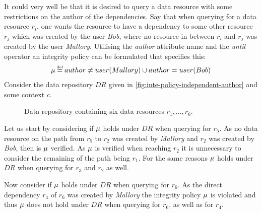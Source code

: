 \begin{example}
It could very well be that it is desired to query a data resource with some restrictions on the author of the dependencies. Say that when querying for a data resource $r_i$, one wants the resource to have a dependency to some other resource $r_j$ which was created by the user \emph{Bob}, where no resource in between $r_i$ and $r_j$ was created by the user \emph{Mallory}. Utilising the \emph{author} attribute name and the \emph{until} operator an integrity policy can be formulated that specifies this:
\begin{align*}
    \inte \eqdef author \neq user(Mallory) \U author = user(Bob)
\end{align*}
Consider the data repository $DR$ given in \autoref{fig:inte-policy-independent-author} and some context $c$.
\begin{figure}[!ht]
    \begin{center}
        
        \caption{Data repository containing six data resources $r_1, \ldots, r_6$.}
        \label{fig:inte-policy-independent-author}
    \end{center}
\end{figure}
Let us start by considering if $\mu$ holds under $DR$ when querying for $r_5$. As no data resource on the path from $r_5$ to $r_2$ was created by \emph{Mallory} and $r_2$ was created by \emph{Bob}, then is $\mu$ verified. As $\mu$ is verified when reaching $r_2$ it is unnecessary to consider the remaining of the path being $r_1$. For the same reasons $\mu$ holds under $DR$ when querying for $r_3$ and $r_2$ as well.

Now consider if $\mu$ holds under $DR$ when querying for $r_6$. As the direct dependency $r_4$ of $r_6$ was created by \emph{Mallory} the integrity policy $\mu$ is violated and thus $\mu$ does not hold under $DR$ when querying for $r_6$, as well as for $r_4$.
\end{example}

